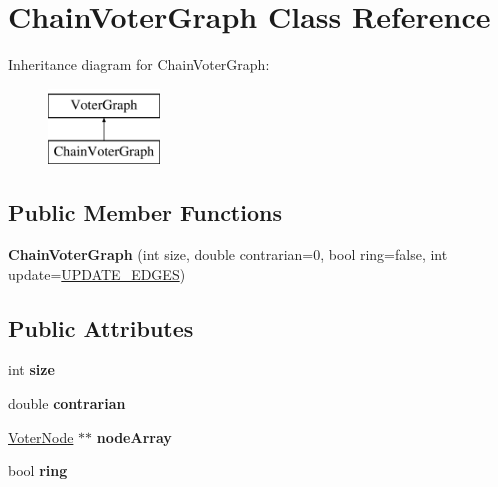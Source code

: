 \hypertarget{class_chain_voter_graph}{\section{Chain\-Voter\-Graph Class Reference}
\label{class_chain_voter_graph}
}
Inheritance diagram for Chain\-Voter\-Graph\-:\begin{figure}[H]
\begin{center}
\leavevmode
\includegraphics[height=2.000000cm]{class_chain_voter_graph}
\end{center}
\end{figure}
\subsection*{Public Member Functions}
\begin{DoxyCompactItemize}
\item 
\hypertarget{class_chain_voter_graph_af0e0e5327d26e67d46df0b33bb009c69}{{\bfseries Chain\-Voter\-Graph} (int size, double contrarian=0, bool ring=false, int update=\hyperlink{voter__graph_8hpp_ab3bec55c359e4ed771339c8bc61fc35aa01d100088352e1a7d3a34c9a66d0f951}{U\-P\-D\-A\-T\-E\-\_\-\-E\-D\-G\-E\-S})}\label{class_chain_voter_graph_af0e0e5327d26e67d46df0b33bb009c69}

\end{DoxyCompactItemize}
\subsection*{Public Attributes}
\begin{DoxyCompactItemize}
\item 
\hypertarget{class_chain_voter_graph_a03a3e2fb44bd8c4e0e1697545d4eff65}{int {\bfseries size}}\label{class_chain_voter_graph_a03a3e2fb44bd8c4e0e1697545d4eff65}

\item 
\hypertarget{class_chain_voter_graph_ace4b3a77876d38f216552e4b5bfaf32b}{double {\bfseries contrarian}}\label{class_chain_voter_graph_ace4b3a77876d38f216552e4b5bfaf32b}

\item 
\hypertarget{class_chain_voter_graph_a0b9e76e99e2666ca7e92ec757ce24d32}{\hyperlink{class_voter_node}{Voter\-Node} $\ast$$\ast$ {\bfseries node\-Array}}\label{class_chain_voter_graph_a0b9e76e99e2666ca7e92ec757ce24d32}

\item 
\hypertarget{class_chain_voter_graph_afb107128956fbedd499dfbfeef8fe14c}{bool {\bfseries ring}}\label{class_chain_voter_graph_afb107128956fbedd499dfbfeef8fe14c}

\end{DoxyCompactItemize}


